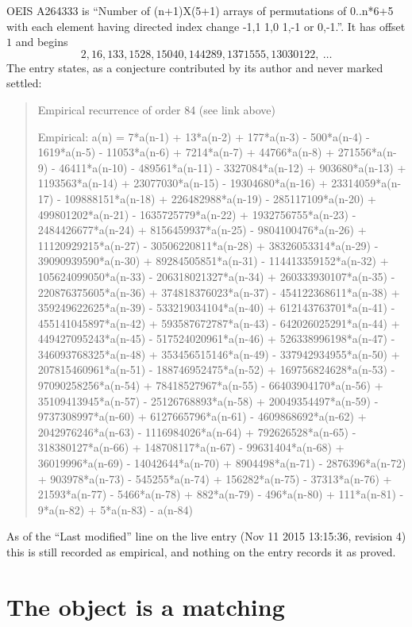\documentclass[11pt,a4paper]{article}
\theoremstyle{plain}
\theoremstyle{definition}
\begin{document}
OEIS A264333 is ``Number of (n+1)X(5+1) arrays of permutations of 0..n*6+5 with each element having directed index change -1,1 1,0 1,-1 or 0,-1.''. It has offset $1$ and begins
\[
2, 16, 133, 1528, 15040, 144289, 1371555, 13030122,\ \dots
\]
The entry states, as a conjecture contributed by its author and never marked settled:
\begin{quote}
Empirical recurrence of order 84 (see link above)

Empirical: a(n) = 7*a(n-1) + 13*a(n-2) + 177*a(n-3) - 500*a(n-4) - 1619*a(n-5) - 11053*a(n-6) + 7214*a(n-7) + 44766*a(n-8) + 271556*a(n-9) - 46411*a(n-10) - 489561*a(n-11) - 3327084*a(n-12) + 903680*a(n-13) + 1193563*a(n-14) + 23077030*a(n-15) - 19304680*a(n-16) + 23314059*a(n-17) - 109888151*a(n-18) + 226482988*a(n-19) - 285117109*a(n-20) + 499801202*a(n-21) - 1635725779*a(n-22) + 1932756755*a(n-23) - 2484426677*a(n-24) + 8156459937*a(n-25) - 9804100476*a(n-26) + 11120929215*a(n-27) - 30506220811*a(n-28) + 38326053314*a(n-29) - 39090939590*a(n-30) + 89284505851*a(n-31) - 114413359152*a(n-32) + 105624099050*a(n-33) - 206318021327*a(n-34) + 260333930107*a(n-35) - 220876375605*a(n-36) + 374818376023*a(n-37) - 454122368611*a(n-38) + 359249622625*a(n-39) - 533219034104*a(n-40) + 612143763701*a(n-41) - 455141045897*a(n-42) + 593587672787*a(n-43) - 642026025291*a(n-44) + 449427095243*a(n-45) - 517524020961*a(n-46) + 526338996198*a(n-47) - 346093768325*a(n-48) + 353456515146*a(n-49) - 337942934955*a(n-50) + 207815460961*a(n-51) - 188746952475*a(n-52) + 169756824628*a(n-53) - 97090258256*a(n-54) + 78418527967*a(n-55) - 66403904170*a(n-56) + 35109413945*a(n-57) - 25126768893*a(n-58) + 20049354497*a(n-59) - 9737308997*a(n-60) + 6127665796*a(n-61) - 4609868692*a(n-62) + 2042976246*a(n-63) - 1116984026*a(n-64) + 792626528*a(n-65) - 318380127*a(n-66) + 148708117*a(n-67) - 99631404*a(n-68) + 36019996*a(n-69) - 14042644*a(n-70) + 8904498*a(n-71) - 2876396*a(n-72) + 903978*a(n-73) - 545255*a(n-74) + 156282*a(n-75) - 37313*a(n-76) + 21593*a(n-77) - 5466*a(n-78) + 882*a(n-79) - 496*a(n-80) + 111*a(n-81) - 9*a(n-82) + 5*a(n-83) - a(n-84)
\end{quote}
As of the ``Last modified'' line on the live entry (Nov 11 2015 13:15:36, revision 4) this is still
recorded as empirical, and nothing on the entry records it as proved.

\section{The object is a matching}
\end{document}
